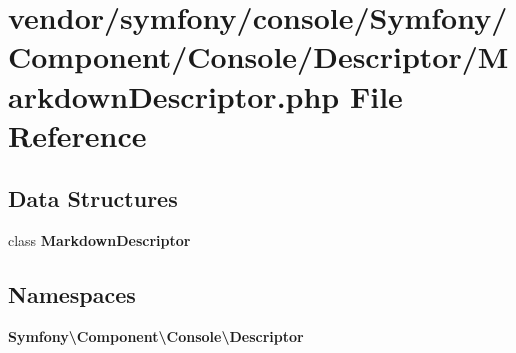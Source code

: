 \section{vendor/symfony/console/\+Symfony/\+Component/\+Console/\+Descriptor/\+Markdown\+Descriptor.php File Reference}
\label{_markdown_descriptor_8php}
\subsection*{Data Structures}
\begin{DoxyCompactItemize}
\item 
class {\bf Markdown\+Descriptor}
\end{DoxyCompactItemize}
\subsection*{Namespaces}
\begin{DoxyCompactItemize}
\item 
 {\bf Symfony\textbackslash{}\+Component\textbackslash{}\+Console\textbackslash{}\+Descriptor}
\end{DoxyCompactItemize}
